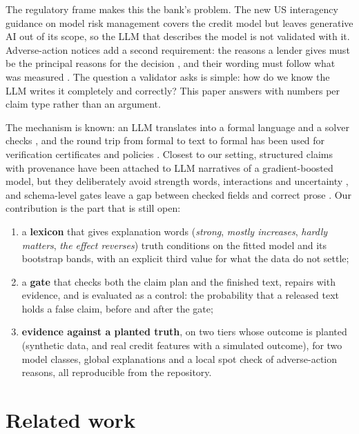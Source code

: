 \documentclass[11pt]{article}
\begin{document}
The regulatory frame makes this the bank's problem. The new US interagency guidance on model risk management
\citep{sr262026} covers the credit model but leaves generative AI out of its scope, so the LLM that describes the model
is not validated with it. Adverse-action notices add a second requirement: the reasons a lender gives must be the
principal reasons for the decision \citep{regb}, and their wording must follow what was measured
\citep{sudjianto2026evidence}. The question a validator asks is simple: how do we know the LLM writes it completely
and correctly? This paper answers with numbers per claim type rather than an argument.

The mechanism is known: an LLM translates into a formal language and a solver checks \citep{gao2023pal,pan2023logiclm,
nezhad2025symcode}, and the round trip from formal to text to formal has been used for verification certificates and
policies \citep{rodriguez2026cycle,an2025neurosymbolic}. Closest to our setting, structured claims with provenance
have been attached to LLM narratives of a gradient-boosted model, but they deliberately avoid strength words,
interactions and uncertainty \citep{kim2026reasoning}, and schema-level gates leave a gap between checked fields and
correct prose \citep{gupta2026veritygate}. Our contribution is the part that is still open:

\begin{enumerate}
\item a \textbf{lexicon} that gives explanation words (\emph{strong}, \emph{mostly increases}, \emph{hardly matters},
\emph{the effect reverses}) truth conditions on the fitted model and its bootstrap bands, with an explicit third value
for what the data do not settle;
\item a \textbf{gate} that checks both the claim plan and the finished text, repairs with evidence, and is evaluated as
a control: the probability that a released text holds a false claim, before and after the gate;
\item \textbf{evidence against a planted truth}, on two tiers whose outcome is planted (synthetic data, and real credit
features with a simulated outcome), for two model classes, global explanations and a local spot check of
adverse-action reasons, all reproducible from the repository.
\end{enumerate}

\section{Related work}
\end{document}

